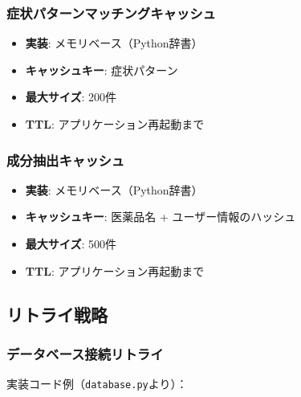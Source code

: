 \documentclass[a4paper,11pt,ja=standard,xelatex]{bxjsarticle}
\theoremstyle{definition}
\begin{document}
\subsubsection{症状パターンマッチングキャッシュ}

\begin{itemize}
\item \textbf{実装}: メモリベース（Python辞書）
\item \textbf{キャッシュキー}: 症状パターン
\item \textbf{最大サイズ}: 200件
\item \textbf{TTL}: アプリケーション再起動まで
\end{itemize}

\subsubsection{成分抽出キャッシュ}

\begin{itemize}
\item \textbf{実装}: メモリベース（Python辞書）
\item \textbf{キャッシュキー}: 医薬品名 + ユーザー情報のハッシュ
\item \textbf{最大サイズ}: 500件
\item \textbf{TTL}: アプリケーション再起動まで
\end{itemize}

\subsection{リトライ戦略}

\subsubsection{データベース接続リトライ}

実装コード例（\texttt{database.py}より）：
\end{document}
